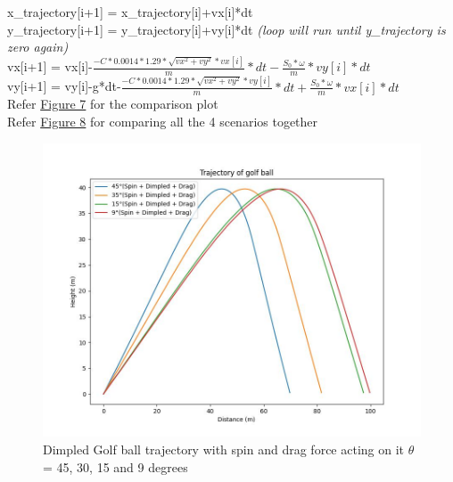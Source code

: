 \documentclass[11pt]{article}
\begin{document}
\begin{raggedright}
\begin{justify}
x\_trajectory[i+1] = x\_trajectory[i]+vx[i]*dt\\
y\_trajectory[i+1] = y\_trajectory[i]+vy[i]*dt \textit{(loop will run until y\_trajectory is zero again)}\\
vx[i+1] = vx[i]-$\frac{-C*0.0014*1.29*\sqrt{vx^2+vy^2}*vx[i]}{m}*dt - \frac{S_0 * \omega}{m}*vy[i]*dt$\\
vy[i+1] = vy[i]-g*dt-$\frac{-C*0.0014*1.29*\sqrt{vx^2+vy^2}*vy[i]}{m}*dt + \frac{S_0 * \omega}{m}*vx[i]*dt$\\

Refer \hyperref[fig:Spin_Dimpled_Fdrag_trajectory]{Figure 7} for the comparison plot\\

Refer \hyperref[fig:trajectory]{Figure 8} for comparing all the 4 scenarios together
\end{justify}
\end{raggedright}
\begin{figure}[b]
    \centering
    \includegraphics[width=\textwidth, height=\textheight, keepaspectratio]{Golf_Trajectory_Spin_Dimpled_drag.jpeg}
    \caption{Dimpled Golf ball trajectory with spin and drag force acting on it $\theta$ = 45, 30, 15 and 9 degrees}
    \label{fig:Spin_Dimpled_Fdrag_trajectory}
\end{figure}
\end{document}
